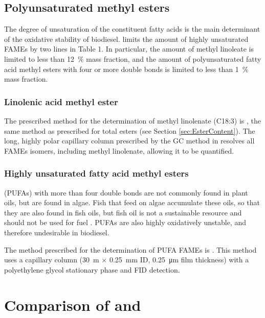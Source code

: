 \subsection{Polyunsaturated methyl esters}
\label{sec:ChromDetUnsat}

The degree of unsaturation of the constituent fatty acids is the main
determinant of the oxidative stability of biodiesel.  limits the
amount of highly unsaturated FAMEs by two lines in Table 1. In particular, the
amount of methyl linoleate is limited to less than \SI{12}{\percent} mass
fraction, and the amount of polyunsaturated fatty acid methyl esters with four
or more double bonds is limited to less than \SI{1}{\percent} mass fraction.

\subsubsection{Linolenic acid methyl ester}

The prescribed method for the determination of methyl linolenate (C18:3) is
, the same method as prescribed for total esters (see Section
\ref{sec:EsterContent}). The long, highly polar capillary column prescribed by
the GC method in  resolves all FAMEs isomers, including methyl
linolenate, allowing it to be quantified.

\subsubsection{Highly unsaturated fatty acid methyl esters}
\label{sec:PUFA}

 (PUFAs) with more than four double bonds are
not commonly found in plant oils, but are found in algae. Fish that feed on
algae accumulate these oils, so that they are also found in fish oils, but fish
oil is not a sustainable resource and should not be used for fuel
\autocite{Kitessa2014}. PUFAs are also highly oxidatively unstable, and
therefore undesirable in biodiesel.

The method prescribed for the determination of PUFA FAMEs is .
This method uses a capillary column (\SI{30}{\metre} × \SI{0.25}{\milli\metre}
ID, \SI{0.25}{\micro\metre} film thickness) with a polyethylene glycol
stationary phase and FID detection.

\section{Comparison of \texorpdfstring{}{SANS 1935} and \texorpdfstring{}{SANS 342}}

